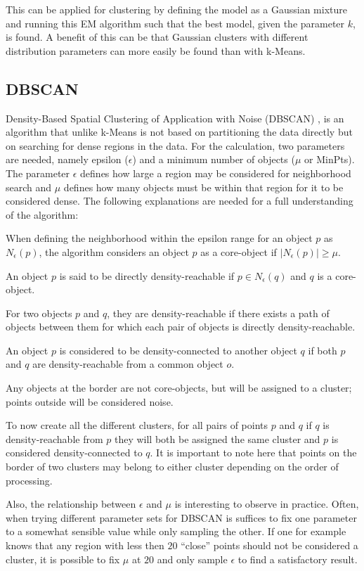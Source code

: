 \documentclass[
	a4paper,
	english,
	twoside,
	openright,               
	11pt                            
	]{report}
\begin{document}
This can be applied for clustering by defining the model as a Gaussian mixture and running this EM algorithm such that the best model, given the parameter $k$, is found. A benefit of this can be that Gaussian clusters with different distribution parameters can more easily be found than with k-Means.

\subsection{DBSCAN}
Density-Based Spatial Clustering of Application with Noise (DBSCAN) \cite{10.5555/3001460.3001507}, is an algorithm that unlike k-Means is not based on partitioning the data directly but on searching for dense regions in the data. For the calculation, two parameters are needed, namely epsilon ($\epsilon$) and a minimum number of objects ($\mu$ or MinPts). The parameter $\epsilon$ defines how large a region may be considered for neighborhood search and $\mu$ defines how many objects must be within that region for it to be considered dense. The following explanations are needed for a full understanding of the algorithm:
\newline

When defining the neighborhood within the epsilon range for an object $p$ as $N_\epsilon(p)$, the algorithm considers an object $p$ as a core-object if $|N_\epsilon(p)|\geq \mu$.

An object $p$ is said to be directly density-reachable if $p\in N_\epsilon(q) $ and $q$ is a core-object.

For two objects $p$ and $q$, they are density-reachable if there exists a path of objects between them for which each pair of objects is directly density-reachable.

An object $p$ is considered to be density-connected to another object $q$ if both $p$ and $q$ are density-reachable from a common object $o$.

Any objects at the border are not core-objects, but will be assigned to a cluster; points outside will be considered noise.
\newline

To now create all the different clusters, for all pairs of points $p$ and $q$ if $q$ is density-reachable from $p$ they will both be assigned the same cluster and $p$ is considered density-connected to $q$. It is important to note here that points on the border of two clusters may belong to either cluster depending on the order of processing.

Also, the relationship between $\epsilon$ and $\mu$ is interesting to observe in practice. Often, when trying different parameter sets for DBSCAN is suffices to fix one parameter to a somewhat sensible value while only sampling the other. If one for example knows that any region with less then $20$ ``close'' points should not be considered a cluster, it is possible to fix $\mu$ at $20$ and only sample $\epsilon$ to find a satisfactory result.
\end{document}
